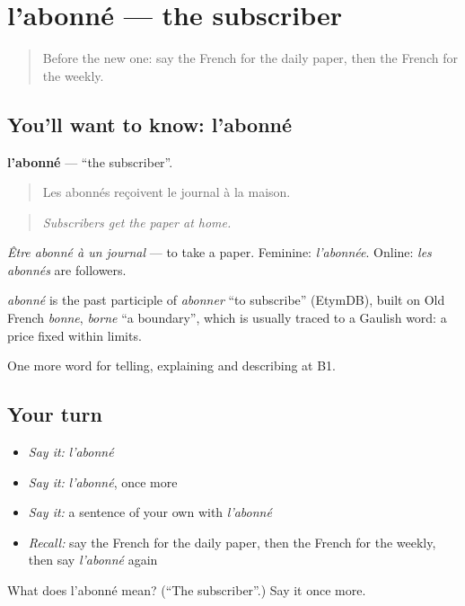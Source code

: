 \section[l'abonné]{l'abonné — the subscriber}

\label{lesson:FR-C278-abonne}



\begin{quote}
Before the new one: say the French for the daily paper, then the French for the weekly.
\end{quote}

\subsection*{You'll want to know: l'abonné}
\textbf{l'abonné} — \textquotedblleft{}the subscriber\textquotedblright{}.

\begin{quote}
Les abonnés reçoivent le journal à la maison.
\end{quote}

\begin{quote}
\emph{Subscribers get the paper at home.}
\end{quote}

\emph{Être abonné à un journal} — to take a paper. Feminine: \emph{l'abonnée}. Online: \emph{les abonnés} are followers.

\begin{cousinweb}
\emph{abonné} is the past participle of \emph{abonner} \textquotedblleft{}to subscribe\textquotedblright{} (EtymDB), built on Old French \emph{bonne}, \emph{borne} \textquotedblleft{}a boundary\textquotedblright{}, which is usually traced to a Gaulish word: a price fixed within limits.
\end{cousinweb}

\begin{grammarlens}[title={What you've built}]
One more word for telling, explaining and describing at B1.
\end{grammarlens}

\subsection*{Your turn}
\begin{itemize}
\raggedright
  \item \emph{Say it:} \emph{l'abonné}
  \item \emph{Say it:} \emph{l'abonné}, once more
  \item \emph{Say it:} a sentence of your own with \emph{l'abonné}
  \item \emph{Recall:} say the French for the daily paper, then the French for the weekly, then say \emph{l'abonné} again
\end{itemize}

\begin{tcolorbox}[breakable,colback=teal!4,colframe=teal!35!black,title={Before you move on}]
What does l'abonné mean? (\textquotedblleft{}The subscriber\textquotedblright{}.) Say it once more.
\end{tcolorbox}
